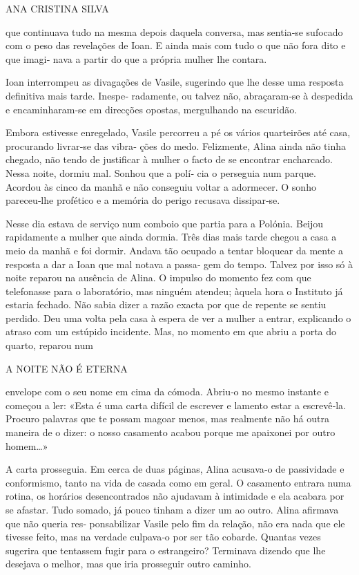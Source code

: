 ANA CRISTINA SILVA

que continuava tudo na mesma depois daquela conversa, mas sentia‑se
sufocado com o peso das revelações de Ioan. E ainda mais com tudo o que
não fora dito e que imagi‑ nava a partir do que a própria mulher lhe
contara.

Ioan interrompeu as divagações de Vasile, sugerindo que lhe desse uma
resposta definitiva mais tarde. Inespe‑ radamente, ou talvez não,
abraçaram‑se à despedida e encaminharam‑se em direcções opostas,
mergulhando na escuridão.

Embora estivesse enregelado, Vasile percorreu a pé os vários quarteirões
até casa, procurando livrar‑se das vibra‑ ções do medo. Felizmente,
Alina ainda não tinha chegado, não tendo de justificar à mulher o facto
de se encontrar encharcado. Nessa noite, dormiu mal. Sonhou que a polí‑
cia o perseguia num parque. Acordou às cinco da manhã e não conseguiu
voltar a adormecer. O sonho pareceu‑lhe profético e a memória do perigo
recusava dissipar‑se.

Nesse dia estava de serviço num comboio que partia para a Polónia.
Beijou rapidamente a mulher que ainda dormia. Três dias mais tarde
chegou a casa a meio da manhã e foi dormir. Andava tão ocupado a tentar
bloquear da mente a resposta a dar a Ioan que mal notava a passa‑ gem do
tempo. Talvez por isso só à noite reparou na ausência de Alina. O
impulso do momento fez com que telefonasse para o laboratório, mas
ninguém atendeu; àquela hora o Instituto já estaria fechado. Não sabia
dizer a razão exacta por que de repente se sentiu perdido. Deu uma volta
pela casa à espera de ver a mulher a entrar, explicando o atraso com um
estúpido incidente. Mas, no momento em que abriu a porta do quarto,
reparou num

A NOITE NÃO É ETERNA

envelope com o seu nome em cima da cómoda. Abriu‑o no mesmo instante e
começou a ler: «Esta é uma carta difícil de escrever e lamento estar a
escrevê‑la. Procuro palavras que te possam magoar menos, mas realmente
não há outra maneira de o dizer: o nosso casamento acabou porque me
apaixonei por outro homem\ldots{}»

A carta prosseguia. Em cerca de duas páginas, Alina acusava‑o de
passividade e conformismo, tanto na vida de casada como em geral. O
casamento entrara numa rotina, os horários desencontrados não ajudavam à
intimidade e ela acabara por se afastar. Tudo somado, já pouco tinham a
dizer um ao outro. Alina afirmava que não queria res‑ ponsabilizar
Vasile pelo fim da relação, não era nada que ele tivesse feito, mas na
verdade culpava‑o por ser tão cobarde. Quantas vezes sugerira que
tentassem fugir para o estrangeiro? Terminava dizendo que lhe desejava o
melhor, mas que iria prosseguir outro caminho.


